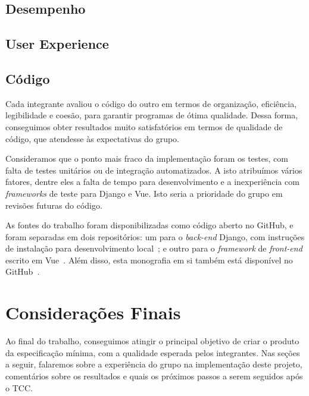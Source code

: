 \documentclass[]{politex}
\begin{document}

\section{Desempenho}


\section{User Experience}


\section{Código}

Cada integrante avaliou o código do outro em termos de organização, eficiência,
legibilidade e coesão, para garantir programas de ótima qualidade. Dessa forma,
conseguimos obter resultados muito satisfatórios em termos de qualidade de
código, que atendesse às expectativas do grupo.

Consideramos que o ponto mais fraco da implementação foram os testes, com falta
de testes unitários ou de integração automatizados. A isto atribuímos vários
fatores, dentre eles a falta de tempo para desenvolvimento e a inexperiência
com \textit{frameworks} de teste para Django e Vue. Isto seria a prioridade
do grupo em revisões futuras do código.

As fontes do trabalho foram disponibilizadas como código aberto no GitHub, e
foram separadas em dois repositórios: um para o \textit{back-end} Django, com
instruções de instalação para desenvolvimento local~\cite{repo-django}; e outro
para o \textit{framework} de \textit{front-end} escrito em Vue~\cite{repo-vue}.
Além disso, esta monografia em si também está disponível no GitHub~\cite{repo-tcc}.

\chapter{Considerações Finais}

Ao final do trabalho, conseguimos atingir o principal objetivo de criar o
produto da especificação mínima, com a qualidade esperada pelos integrantes.
Nas seções a seguir, falaremos sobre a experiência do grupo na implementação
deste projeto, comentários sobre os resultados e quais os próximos passos a
serem seguidos após o TCC.
\end{document}
